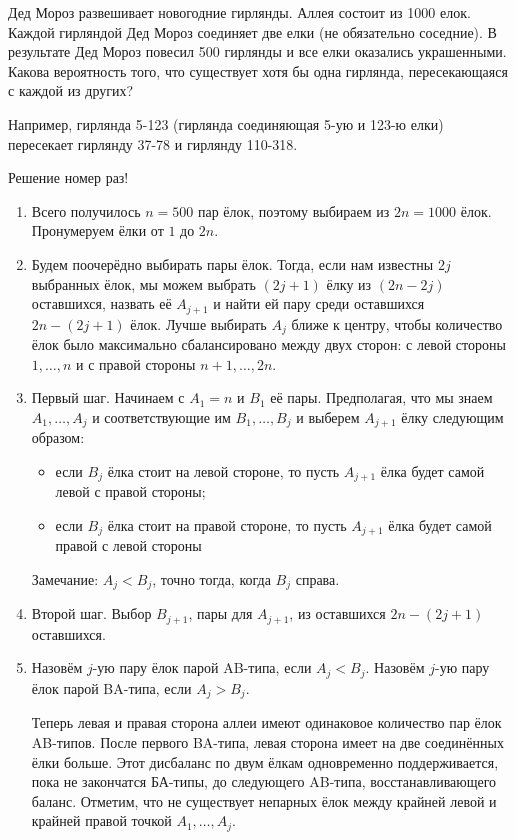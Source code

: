 \documentclass[a4paper]{caesar_book}
\theoremstyle{definition}
\newcounter{problem}
\newenvironment{problem}%
{%
\refstepcounter{problem}%
     \hypertarget{problem:{\theproblem}}{}
     \Writetofile{solution_file}{\protect\hypertarget{soln:\theproblem}{}}
     \begin{myenum}[label=\bfseries\protect\hyperlink{soln:\theproblem}{\theproblem}, ref=\theproblem, leftmargin=0pt]
     \item%
    }%
    {%
    \end{myenum}}
\begin{document}
\begin{problem}
Дед Мороз развешивает новогодние гирлянды. Аллея состоит из 1000 елок.
Каждой гирляндой Дед Мороз соединяет две елки (не обязательно соседние).
В результате Дед Мороз повесил 500 гирлянды и все елки оказались украшенными.
Какова вероятность того, что существует хотя бы одна гирлянда,
пересекающаяся с каждой из других?

Например, гирлянда 5-123 (гирлянда соединяющая 5-ую и 123-ю елки)
пересекает гирлянду 37-78 и гирлянду 110-318.

\begin{sol}
Решение номер раз!

\begin{enumerate}
\item Всего получилось $n=500$ пар ёлок, поэтому выбираем из $2n=1000$ ёлок.
Пронумеруем ёлки от $1$ до $2n$.

\item Будем поочерёдно выбирать пары ёлок. Тогда,
если нам известны $2j$ выбранных ёлок,
мы можем выбрать $(2j+1)$ ёлку из $(2n-2j)$ оставшихся, назвать её $A_{j+1}$
и найти ей пару среди оставшихся $2n-(2j+1)$ ёлок.
Лучше выбирать $A_j$ ближе к центру, чтобы количество ёлок
было максимально сбалансировано между двух сторон:
с левой стороны ${1,\ldots ,n}$ и с правой стороны ${n+1,\ldots ,2n}$.

\item Первый шаг. Начинаем с $A_1=n$ и $B_1$ её пары.
Предполагая, что мы знаем $A_1,\ldots ,A_j$  и соответствующие им $B_1,\ldots , B_j$
и выберем $A_{j+1}$ ёлку следующим образом:
\begin{itemize}
\item если $B_j$ ёлка стоит на левой стороне,
то пусть $A_{j+1}$ ёлка будет самой левой с правой стороны;

\item если $B_j$ ёлка стоит на правой стороне,
то пусть $A_{j+1}$ ёлка будет самой правой с левой стороны
\end{itemize}
Замечание: $A_j<B_j$, точно тогда, когда $B_j$ справа.

\item Второй шаг. Выбор $B_{j+1}$, пары для $A_{j+1}$,
из оставшихся $2n-(2j+1)$ оставшихся.

\item Назовём $j$-ую пару ёлок парой AB-типа, если $A_j<B_j$.
Назовём $j$-ую пару ёлок парой BA-типа, если $A_j>B_j$.

Теперь левая и правая сторона аллеи имеют одинаковое количество пар ёлок AB-типов.
После первого BA-типа, левая сторона имеет на две соединённых ёлки больше.
Этот дисбаланс по двум ёлкам одновременно поддерживается, пока не закончатся БА-типы,
до следующего AB-типа, восстанавливающего баланс.
Отметим, что не существует непарных ёлок между крайней левой
и крайней правой точкой $A_1,\ldots ,A_j$.


\end{enumerate}
\end{sol}
\end{problem}
\end{document}
